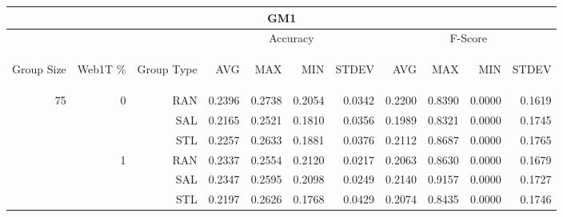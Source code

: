 \begin{center}
\begin{table}[htbp]
\begin{tabular}{ | r | r | r | r | r | r | r | r | r | r | r |}
\hline
\multicolumn{11}{|c|}{GM1}\\
\hline
 & & & \multicolumn{4}{|c|}{Accuracy} & \multicolumn{4}{|c|}{F-Score}\\ \cline{4-11}
\begin{sideways}Group Size\end{sideways} & \begin{sideways}Web1T \%\end{sideways} & \begin{sideways}Group Type\end{sideways} & \begin{sideways}AVG\end{sideways} & \begin{sideways}MAX\end{sideways} & \begin{sideways}MIN\end{sideways} & \begin{sideways}STDEV\end{sideways} & \begin{sideways}AVG\end{sideways} & \begin{sideways}MAX\end{sideways} & \begin{sideways}MIN\end{sideways} & \begin{sideways}STDEV\end{sideways}\\
\hline
\multirow{18}{*}{75}
 & \multirow{3}{*}{0} & RAN & 0.2396 & 0.2738 & 0.2054 & 0.0342 & 0.2200 & 0.8390 & 0.0000 & 0.1619\\ \cline{3-11}
 &   & SAL & 0.2165 & 0.2521 & 0.1810 & 0.0356 & 0.1989 & 0.8321 & 0.0000 & 0.1745\\ \cline{3-11}
 &   & STL & 0.2257 & 0.2633 & 0.1881 & 0.0376 & 0.2112 & 0.8687 & 0.0000 & 0.1765\\ \cline{2-11}
 & \multirow{3}{*}{1} & RAN & 0.2337 & 0.2554 & 0.2120 & 0.0217 & 0.2063 & 0.8630 & 0.0000 & 0.1679\\ \cline{3-11}
 &   & SAL & 0.2347 & 0.2595 & 0.2098 & 0.0249 & 0.2140 & 0.9157 & 0.0000 & 0.1727\\ \cline{3-11}
 &   & STL & 0.2197 & 0.2626 & 0.1768 & 0.0429 & 0.2074 & 0.8435 & 0.0000 & 0.1746\\ \cline{2-11}

\end{tabular}
\end{table}
\end{center}
